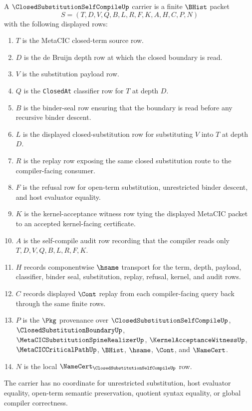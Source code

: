 \begin{definition}
\label{def:closed-substitution-self-compile-carrier}
A $\ClosedSubstitutionSelfCompileUp$ carrier is a finite $\BHist$ packet
$$
S=(T,D,V,Q,B,L,R,F,K,A,H,C,P,N)
$$
with the following displayed rows:
\begin{enumerate}
\item $T$ is the MetaCIC closed-term source row.
\item $D$ is the de Bruijn depth row at which the closed boundary is read.
\item $V$ is the substitution payload row.
\item $Q$ is the \texttt{ClosedAt} classifier row for $T$ at depth $D$.
\item $B$ is the binder-seal row ensuring that the boundary is read before any recursive binder descent.
\item $L$ is the displayed closed-substitution row for substituting $V$ into $T$ at depth $D$.
\item $R$ is the replay row exposing the same closed substitution route to the compiler-facing consumer.
\item $F$ is the refusal row for open-term substitution, unrestricted binder descent, and host evaluator equality.
\item $K$ is the kernel-acceptance witness row tying the displayed MetaCIC packet to an accepted kernel-facing certificate.
\item $A$ is the self-compile audit row recording that the compiler reads only $T,D,V,Q,B,L,R,F,K$.
\item $H$ records componentwise $\hsame$ transport for the term, depth, payload, classifier, binder seal, substitution, replay, refusal, kernel, and audit rows.
\item $C$ records displayed $\Cont$ replay from each compiler-facing query back through the same finite rows.
\item $P$ is the $\Pkg$ provenance over $\ClosedSubstitutionSelfCompileUp$, $\ClosedSubstitutionBoundaryUp$, $\MetaCICSubstitutionSpineRealizerUp$, $\KernelAcceptanceWitnessUp$, $\MetaCICCriticalPathUp$, $\BHist$, $\hsame$, $\Cont$, and $\NameCert$.
\item $N$ is the local $\NameCert_{\ClosedSubstitutionSelfCompileUp}$ row.
\end{enumerate}
The carrier has no coordinate for unrestricted substitution, host evaluator equality, open-term semantic preservation, quotient syntax equality, or global compiler correctness.
\end{definition}


